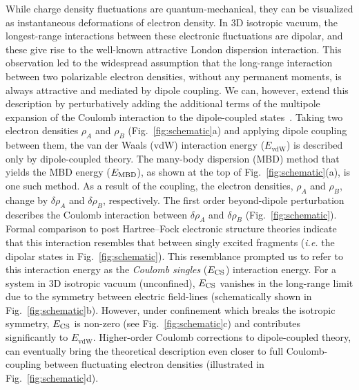 \documentclass[aps,prl,groupaddress, twocolumn]{revtex4-1}  %
\begin{document}
While charge density fluctuations are quantum-mechanical, they can be visualized as instantaneous deformations of electron density. In 3D isotropic vacuum, the longest-range interactions between these electronic fluctuations are dipolar, and these give rise to the well-known attractive London dispersion interaction. This observation led to the widespread assumption that the long-range interaction between two polarizable electron densities, without any permanent moments, is always attractive and mediated by dipole coupling. We can, however, extend this description by perturbatively adding the additional terms of the multipole expansion of the Coulomb interaction to the dipole-coupled states~\cite{sadhukhan_prl_2017}. Taking two electron densities $\rho_A$ and $\rho_B$ (Fig.~\ref{fig:schematic}a) and applying dipole coupling between them, the van der Waals (vdW) interaction energy ($E_\text{vdW}$) is described only by dipole-coupled theory. The many-body dispersion (MBD) method that yields the MBD energy ($E_{\rm MBD}$), as shown at the top of Fig.~\ref{fig:schematic}(a), is one such method. As a result of the coupling, the electron densities, $\rho_A$ and $\rho_B$, change by $\delta \rho_A$ and $\delta \rho_B$, respectively. The first order beyond-dipole perturbation describes the Coulomb interaction between $\delta \rho_A$ and $\delta \rho_B$ (Fig.~\ref{fig:schematic}). Formal comparison to post Hartree--Fock electronic structure theories indicate that this interaction resembles that between singly excited fragments (\textit{i.e.} the dipolar states in Fig.~\ref{fig:schematic}). This resemblance prompted us to refer to this interaction energy as the \textit{Coulomb singles} ($E_{\rm CS}$) interaction energy. For a system in 3D isotropic vacuum (unconfined), $E_{\rm CS}$ vanishes in the long-range limit due to the symmetry between electric field-lines (schematically shown in Fig.~\ref{fig:schematic}b). However, under confinement which breaks the isotropic symmetry, $E_{\rm CS}$ is non-zero (see Fig.~\ref{fig:schematic}c) and contributes significantly to $E_\text{vdW}$. %
Higher-order Coulomb corrections to dipole-coupled theory, can eventually bring the theoretical description even closer to full Coulomb-coupling between fluctuating electron densities (illustrated in Fig.~\ref{fig:schematic}d).
\end{document}
